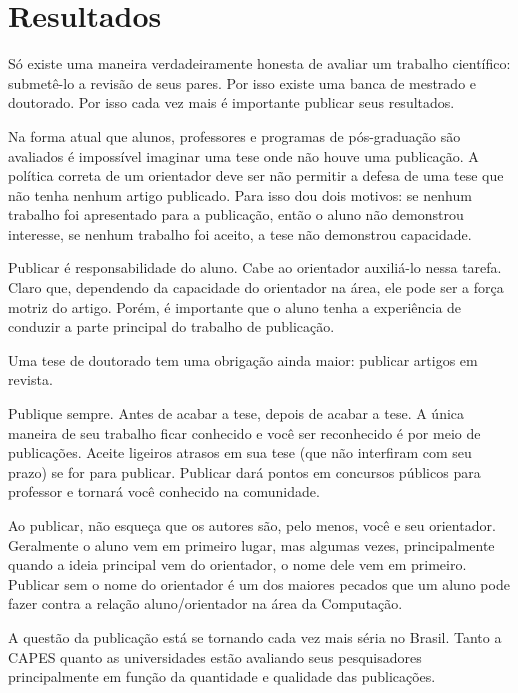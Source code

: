 \chapter{Resultados}

Só existe uma maneira verdadeiramente honesta de avaliar um trabalho científico: submetê-lo a revisão de seus pares. Por isso existe uma banca de mestrado e doutorado. Por isso cada vez mais é importante publicar seus resultados.

Na forma atual que alunos, professores e programas de pós-graduação são avaliados é impossível imaginar uma tese onde não houve uma publicação. A política correta de um orientador deve ser não permitir a defesa de uma tese que não tenha nenhum artigo publicado. Para isso dou dois motivos: se nenhum trabalho foi apresentado para a publicação, então o aluno não demonstrou interesse, se nenhum trabalho foi aceito, a tese não demonstrou capacidade.

Publicar é responsabilidade do aluno. Cabe ao orientador auxiliá-lo nessa tarefa. Claro que, dependendo da capacidade do orientador na área, ele pode ser a força motriz do artigo. Porém, é importante que o aluno tenha a experiência de conduzir a parte principal do trabalho de publicação.

Uma tese de doutorado tem uma obrigação ainda maior: publicar artigos em revista.

Publique sempre. Antes de acabar a tese, depois de acabar a tese. A única maneira de seu trabalho ficar conhecido e você ser reconhecido é por meio de publicações. Aceite ligeiros atrasos em sua tese (que não interfiram com seu prazo) se for para publicar. Publicar dará pontos em concursos públicos para professor e tornará você conhecido na comunidade.

Ao publicar, não esqueça que os autores são, pelo menos, você e seu orientador. Geralmente o aluno vem em primeiro lugar, mas algumas vezes, principalmente quando a ideia principal vem do orientador, o nome dele vem em primeiro. Publicar sem o nome do orientador é um dos maiores pecados que um aluno pode fazer contra a relação aluno/orientador na área da Computação.

A questão da publicação está se tornando cada vez mais séria no Brasil. Tanto a CAPES quanto as universidades estão avaliando seus pesquisadores principalmente em função da quantidade e qualidade das publicações.
